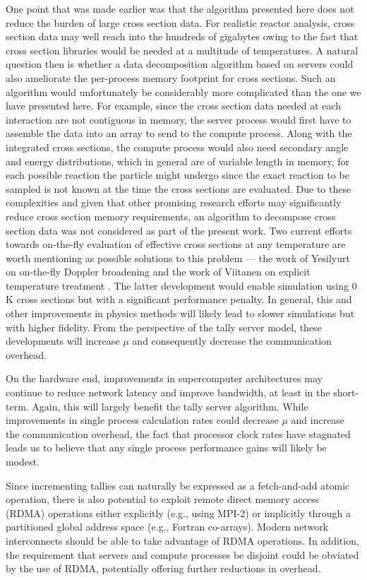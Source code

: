 \documentclass[3p,fleqn]{elsarticle}
\begin{document}
One point that was made earlier was that the algorithm presented here does not
reduce the burden of large cross section data. For realistic reactor analysis,
cross section data may well reach into the hundreds of gigabytes owing to the
fact that cross section libraries would be needed at a multitude of
temperatures. A natural question then is whether a data decomposition algorithm
based on servers could also ameliorate the per-process memory footprint for
cross sections. Such an algorithm would unfortunately be considerably more
complicated than the one we have presented here. For example, since the cross
section data needed at each interaction are not contiguous in memory, the server
process would first have to assemble the data into an array to send to the
compute process. Along with the integrated cross sections, the compute process
would also need secondary angle and energy distributions, which in general are
of variable length in memory, for each possible reaction the particle might
undergo since the exact reaction to be sampled is not known at the time the
cross sections are evaluated. Due to these complexities and given that other
promising research efforts may significantly reduce cross section memory
requirements, an algorithm to decompose cross section data was not considered as
part of the present work. Two current efforts towards on-the-fly evaluation of
effective cross sections at any temperature are worth mentioning as possible
solutions to this problem --- the work of Yesilyurt on on-the-fly Doppler
broadening \cite{nse-yesilyurt-2012} and the work of Viitanen on explicit
temperature treatment \cite{nse-viitanen-2012}. The latter development would
enable simulation using 0 K cross sections but with a significant performance
penalty. In general, this and other improvements in physics methods will likely
lead to slower simulations but with higher fidelity. From the perspective of the
tally server model, these developments will increase $\mu$ and consequently
decrease the communication overhead.

On the hardware end, improvements in supercomputer architectures may continue to
reduce network latency and improve bandwidth, at least in the short-term. Again,
this will largely benefit the tally server algorithm. While improvements in
single process calculation rates could decrease $\mu$ and increase the
communication overhead, the fact that processor clock rates have stagnated leads
us to believe that any single process performance gains will likely be modest.

Since incrementing tallies can naturally be expressed as a fetch-and-add atomic
operation, there is also potential to exploit remote direct memory access (RDMA)
operations either explicitly (e.g., using MPI-2) or implicitly through a
partitioned global address space (e.g., Fortran co-arrays). Modern network
interconnects should be able to take advantage of RDMA operations. In addition,
the requirement that servers and compute processes be disjoint could be obviated
by the use of RDMA, potentially offering further reductions in overhead.
\end{document}
